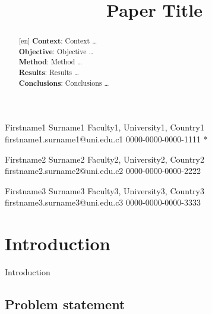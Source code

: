 \documentclass[]{einformatica}
\begin{document}

\title{Paper Title}




\EIauthorI
   {Firstname1}
   {Surname1}
   {Faculty1, University1, Country1}
   {firstname1.surname1@uni.edu.c1}
   {0000-0000-0000-1111} %
   {*} %

\EIauthorII
   {Firstname2}
   {Surname2}
   {Faculty2, University2, Country2}
   {firstname2.surname2@uni.edu.c2}
   {0000-0000-0000-2222}
   {} %
   
\EIauthorIII
   {Firstname3}
   {Surname3}
   {Faculty3, University3, Country3}
   {firstname3.surname3@uni.edu.c3}
   {0000-0000-0000-3333}
   {} %
 

\begin{abstract}[en]
\textbf{Context}:
Context \dots \\ 
\textbf{Objective}: 
Objective \dots \\
\textbf{Method}: 
Method \dots \\
\textbf{Results}: 
Results \dots \\
\textbf{Conclusions}: 
Conclusions \dots
\end{abstract}

\maketitle 
 

\section{Introduction}\label{sec:Introduction}

Introduction
\cite{KitchenhamMadeyski17ESE} %


\subsection*{Problem statement} %
\end{document}
